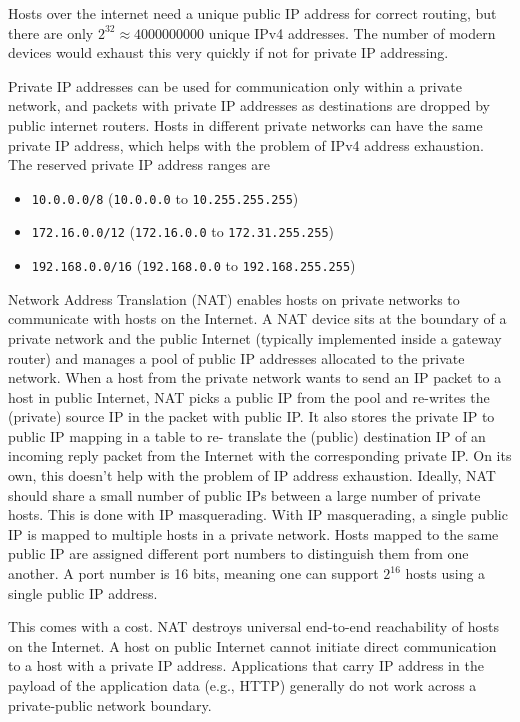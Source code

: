 Hosts over the internet need a unique public IP address for correct routing, but
there are only $2^{32} \approx 4000000000$ unique IPv4 addresses. The number of
modern devices would exhaust this very quickly if not for private IP addressing.

Private IP addresses can be used for communication only within a private network,
and packets with private IP addresses as destinations are dropped by public internet
routers. Hosts in different private networks can have the same private IP address,
which helps with the problem of IPv4 address exhaustion. The reserved private IP
address ranges are
\begin{itemize}
    \item \texttt{10.0.0.0/8} (\texttt{10.0.0.0} to \texttt{10.255.255.255})
    \item \texttt{172.16.0.0/12} (\texttt{172.16.0.0} to \texttt{172.31.255.255})
    \item \texttt{192.168.0.0/16} (\texttt{192.168.0.0} to \texttt{192.168.255.255})
\end{itemize}

Network Address Translation (NAT)
enables hosts on private networks to
communicate with hosts on the Internet.
A NAT device sits at the boundary of a private network and the
public Internet (typically implemented inside a gateway router)
and manages a pool of public IP addresses allocated to the
private network.
When a host from the private network wants to send an IP packet
to a host in public Internet, NAT picks a public IP from the pool and
re-writes the (private) source IP in the packet with public IP.
It also stores the private IP to public IP mapping in a table to re-
translate the (public) destination IP of an incoming reply packet
from the Internet with the corresponding private IP.
On its own, this doesn't help with the problem of IP address exhaustion.
Ideally, NAT should share a small number of public IPs
between a large number of private hosts. This is done with IP
masquerading.
With IP masquerading, a single public IP is mapped to multiple
hosts in a private network.
Hosts mapped to the same public IP are assigned different
port numbers to distinguish them from one another.
A port number is 16 bits, meaning one can support $2^16$ hosts
using a single public IP address.

This comes with a cost. NAT destroys universal end-to-end
reachability of hosts on the Internet. A host on public
Internet cannot initiate direct communication to a
host with a private IP address. Applications that carry IP
address in the payload of the application data
(e.g., HTTP) generally do not work across a private-public
network boundary.

